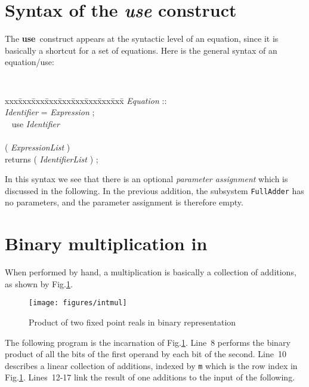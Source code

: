 \section{Syntax of the \emph{use} construct}

The \textbf{use}\ construct appears at the syntactic
level of an equation, since it is basically a shortcut for a set of
equations. Here is the general syntax of an equation/use:
{\tt
\begin{tabbing}
xxx\= xxx\= xxx\= xxx\= xxx\= xxx\= xxx\= xxx\= xxx\=  \kill
\textsl{Equation} ::\\
\>\> \textsl{Identifier} = \textsl{Expression} ;\\
\> \Alt\ \> use  \textsl{Identifier}\\
\>\>\>\>\>\>  \\
\>\>\>\>\>\>( \textsl{ExpressionList} )\\
\>\>\> returns\>\>\> ( \textsl{IdentifierList} ) ;
\end{tabbing}
}
 

In this syntax we see that there is an optional \emph{parameter
assignment} which is discussed in the following.
In the previous addition, the subsystem \texttt{FullAdder} has
no parameters, and the parameter assignment is therefore empty. 




\section{Binary multiplication in {\alfa}}

When performed by hand, a multiplication is basically a collection
of additions, as shown by Fig.\ref{intmul}. 

\begin{figure}[!ht]
\begin{center}
    \texttt{[image: figures/intmul]}
  \caption{Product of two fixed point reals in binary representation\label{intmul} }
\end{center}
\end{figure}


The following program is the {\alfa}
incarnation of Fig.\ref{intmul}. Line~8 performs the binary product of
all the bits of the first operand by each bit of the second. Line~10
describes a linear collection of additions, indexed by \texttt{m}
which is the row index in Fig.\ref{intmul}. Lines~12-17 link the
result of one additions to the input of the following. 

